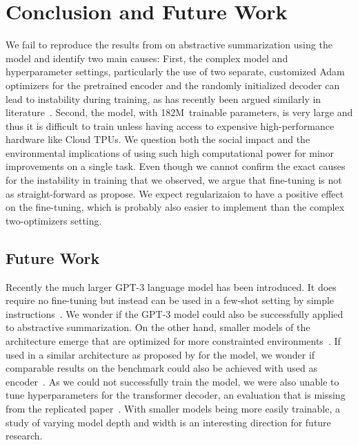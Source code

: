 \section{Conclusion and Future Work} %

We fail to reproduce the results from \citeauthor{LiuL2019} on abstractive summarization using the \BertSumAbs model and identify two main causes:
First, the complex model and hyperparameter settings, particularly the use of two separate, customized Adam optimizers for the pretrained \Bert encoder and the randomly initialized decoder can lead to instability during training, as has recently been argued similarly in literature~\cite{ZhangWKWA2020}. 
Second, the model, with 182M~trainable parameters, is very large and thus it is difficult to train unless having access to expensive high-performance hardware like Cloud TPUs. 
We question both the social impact and the environmental implications of using such high computational power for minor improvements on a single task.
Even though we cannot confirm the exact causes for the instability in training that we observed, we argue that fine-tuning \Bert is not as straight-forward as \citeauthor{LiuL2019} propose.
We expect regularizaion to have a positive effect on the fine-tuning, which is probably also easier to implement than the complex two-optimizers setting.

\subsection{Future Work}

Recently the much larger GPT-3 language model has been introduced. It does require no fine-tuning but instead can be used in a few-shot setting by simple instructions~\cite{BrownMRSKDNSSAA2020}.
We wonder if the GPT-3 model could also be successfully applied to abstractive summarization.
On the other hand, smaller models of the \Bert architecture emerge that are optimized for more constrainted environments~\cite{TurcCLT2019}.
If used in a similar architecture as proposed by \citeauthor{LiuL2019} for the \BertSumAbs model, we wonder if comparable results on the \Rouge benchmark could also be achieved with \BertTiny used as encoder~\cite{TurcCLT2019}.
As we could not successfully train the \BertSumAbs model, we were also unable to tune hyperparameters for the transformer decoder, an evaluation that is missing from the replicated paper~\cite{LiuL2019}.
With smaller models being more easily trainable, a study of varying model depth and width is an interesting direction for future research.

